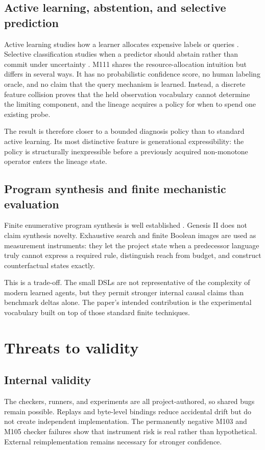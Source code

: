 \subsection{Active learning, abstention, and selective prediction}
Active learning studies how a learner allocates expensive labels or queries \cite{settles2009active}. Selective classification studies when a predictor should abstain rather than commit under uncertainty \cite{geifman2017selective}. M111 shares the resource-allocation intuition but differs in several ways. It has no probabilistic confidence score, no human labeling oracle, and no claim that the query mechanism is learned. Instead, a discrete feature collision proves that the held observation vocabulary cannot determine the limiting component, and the lineage acquires a policy for when to spend one existing probe.

The result is therefore closer to a bounded diagnosis policy than to standard active learning. Its most distinctive feature is generational expressibility: the policy is structurally inexpressible before a previously acquired non-monotone operator enters the lineage state.

\subsection{Program synthesis and finite mechanistic evaluation}
Finite enumerative program synthesis is well established \cite{gulwani2017synthesis}. Genesis II does not claim synthesis novelty. Exhaustive search and finite Boolean images are used as measurement instruments: they let the project state when a predecessor language truly cannot express a required rule, distinguish reach from budget, and construct counterfactual states exactly.

This is a trade-off. The small DSLs are not representative of the complexity of modern learned agents, but they permit stronger internal causal claims than benchmark deltas alone. The paper's intended contribution is the experimental vocabulary built on top of those standard finite techniques.

\section{Threats to validity}
\label{sec:threats}
\subsection{Internal validity}
The checkers, runners, and experiments are all project-authored, so shared bugs remain possible. Replays and byte-level bindings reduce accidental drift but do not create independent implementation. The permanently negative M103 and M105 checker failures show that instrument risk is real rather than hypothetical. External reimplementation remains necessary for stronger confidence.

